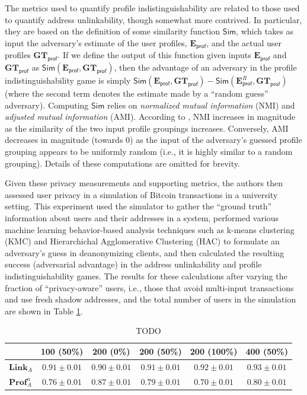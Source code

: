 The metrics used to quantify profile indistinguishability are related to those used to quantify address unlinkability, though somewhat more contrived. In particular, they are based on the definition of some similarity function $\mathsf{Sim}$, which takes as input the adversary's estimate of the user profiles, $\mathbf{E}_\mathsf{prof}$, and the actual user profiles $\mathbf{GT}_\mathsf{prof}$. If we define the output of this function given inputs $\mathbf{E}_\mathsf{prof}$ and $\mathbf{GT}_\mathsf{prof}$ as $\mathsf{Sim}(\mathbf{E}_\mathsf{prof}, \mathbf{GT}_\mathsf{prof})$, then the advantage of an adversary in the profile indistinguishability game is simply $\mathsf{Sim}(\mathbf{E}_\mathsf{prof}, \mathbf{GT}_\mathsf{prof}) - \mathsf{Sim}(\mathbf{E}_\mathsf{prof}^R, \mathbf{GT}_\mathsf{prof})$ (where the second term denotes the estimate made by a ``random guess'' adversary). Computing $\mathsf{Sim}$ relies on \emph{normalized mutual information} (NMI) and \emph{adjusted mutual information} (AMI). According to \cite{19,20}, NMI increases in magnitude as the similarity of the two input profile groupings increases. Conversely, AMI decreases in magnitude (towards 0) as the input of the adversary's guessed profile grouping appears to be uniformly random (i.e., it is highly similar to a random grouping). Details of these computations are omitted for brevity. 

Given these privacy measurements and supporting metrics, the authors then assessed user privacy in a simulation of Bitcoin transactions in a university setting. This experiment used the simulator to gather the ``ground truth'' information about users and their addresses in a system, performed various machine learning behavior-based analysis techniques such as k-means clustering (KMC) and Hierarchichal Agglomerative Clustering (HAC) to formulate an adversary's guess in deanonymizing clients, and then calculated the resulting success (adversarial advantage) in the address unlinkability and profile indistinguishability games. The results for these calculations after varying the fraction of ``privacy-aware'' users, i.e., those that avoid multi-input transactions and use fresh shadow addresses, and the total number of users in the simulation are shown in Table \ref{tab:eval-privacy-results}.

\begin{table}
\begin{center}
\caption{TODO}
\label{tab:eval-privacy-results}
    \begin{tabular}{|l||ccccc|}\hline
    ~                   & 100 (50\%) & 200 (0\%) & 200 (50\%) & 200 (100\%) & 400 (50\%) \\ \hline
    $\mathbf{Link}_A$   & $0.91 \pm 0.01$ & $0.90 \pm 0.01$ & $0.91 \pm 0.01$ & $0.92 \pm 0.01$ & $0.93 \pm 0.01$ \\
    $\mathbf{Prof}_A^a$ & $0.76 \pm 0.01$ & $0.87 \pm 0.01$ & $0.79 \pm 0.01$ & $0.70 \pm 0.01$ & $0.80 \pm 0.01$ \\ \hline
    \end{tabular}
\end{center}
\end{table}

